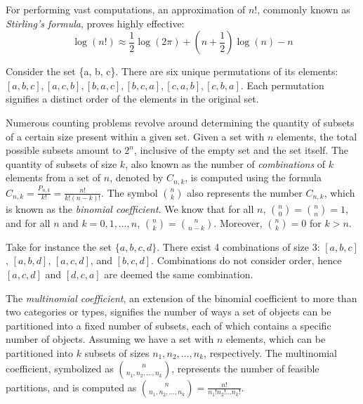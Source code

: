 For performing vast computations, an approximation of $n!$, commonly known as \emph{Stirling's formula}, proves highly effective:
\[
\log\left(n!\right) \approx \frac{1}{2}\log\left(2\pi\right)+\left(n+\frac{1}{2}\right)\log\left(n\right)-n
\]

\begin{example}
Consider the set \{a, b, c\}. There are six unique permutations of its elements: $[a, b, c], [a, c, b], [b, a, c], [b, c, a], [c, a, b], [c, b, a]$. Each permutation signifies a distinct order of the elements in the original set.
\end{example}

Numerous counting problems revolve around determining the quantity of subsets of a certain size present within a given set. Given a set with $n$ elements, the total possible subsets amount to $2^n$, inclusive of the empty set and the set itself. The quantity of subsets of size $k$, also known as the number of \emph{combinations} of $k$ elements from a set of $n$, denoted by $C_{n,k}$, is computed using the formula $C_{n,k}=\frac{P_{n,k}}{k!}=\frac{n!}{k!\left(n-k\right)!}$. The symbol ${n \choose k}$ also represents the number $C_{n,k}$, which is known as the \emph{binomial coefficient}. We know that for all $n$, ${n \choose 0}={n \choose n}=1$, and for all $n$ and $k=0,1,\ldots,n$, ${n \choose k}={n \choose n-k}$. Moreover, ${n \choose k} = 0$ for $k>n$.

\begin{example}
Take for instance the set $\{a, b, c, d \}$. There exist 4 combinations of size 3: $[a, b, c]$, $[a, b, d]$, $[a, c, d]$, and $[b, c, d]$. Combinations do not consider order, hence $[a, c, d]$ and $[d, c, a]$ are deemed the same combination.
\end{example}

The \emph{multinomial coefficient}, an extension of the binomial coefficient to more than two categories or types, signifies the number of ways a set of objects can be partitioned into a fixed number of subsets, each of which contains a specific number of objects. Assuming we have a set with $n$ elements, which can be partitioned into $k$ subsets of sizes $n_1, n_2, \ldots, n_k$, respectively. The multinomial coefficient, symbolized as ${n \choose n_{1},n_{2},\ldots,n_{k}}$, represents the number of feasible partitions, and is computed as ${n \choose n_{1},n_{2},\ldots,n_{k}} = \frac{n!}{n_{1}!n_{2}!\ldots n_{k}!}$.

